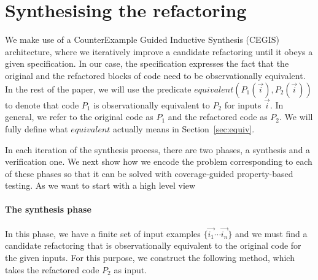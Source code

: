 \documentclass[sigconf,review,anonymous]{acmart}
\begin{document}

 
\section{Synthesising the refactoring}\label{sec:encoding}

We make use of a CounterExample Guided Inductive Synthesis (CEGIS)~\cite{DBLP:conf/pldi/Solar-LezamaJB08} architecture, where we
iteratively improve a candidate refactoring until it obeys a given specification.
In our case, the specification expresses the fact that the original and
the refactored blocks of code need to be observationally equivalent.
%
In the rest of the paper, we will use the predicate
$equivalent(P_1(\vec{i}), P_2(\vec{i}))$ to denote that code $P_1$ is
observationally equivalent to $P_2$ for inputs $\vec{i}$.  In general,
we refer to the original code as $P_1$ and the refactored code as
$P_2$. We will fully define what $equivalent$ actually means in Section~\ref{sec:equiv}.


In each iteration of the synthesis process, there are two phases, a synthesis and a verification one. We next show how we encode the problem corresponding to each of these phases so that it can be solved with coverage-guided property-based testing. As we want to start with a high level view


\paragraph{The synthesis phase} In this phase, we have 
a finite set of input examples $\{\vec{i_1} \cdots \vec{i_n}\}$ and we must find a candidate refactoring
that is observationally equivalent to the original code for the given inputs.
For this purpose, we construct the following  method, which
takes the refactored code $P_2$ as input.
\end{document}

